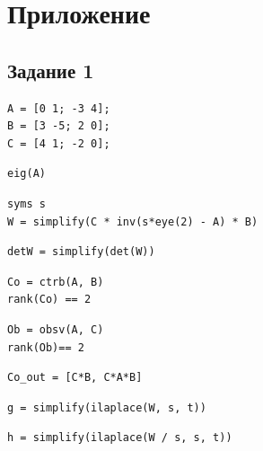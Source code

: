 \documentclass[a4paper,12pt]{article}
\begin{document}
	
	
	
	\newpage
\section{Приложение}

\subsection*{Задание 1}

\begin{lstlisting}[caption={Инициализация}]
A = [0 1; -3 4];
B = [3 -5; 2 0];
C = [4 1; -2 0];
\end{lstlisting}

\begin{lstlisting}[caption={Собственные числа матрицы \(A\)}, label={lst:A1}]
eig(A)
\end{lstlisting}

\begin{lstlisting}[caption={Передаточная матрица системы}, label={lst:W1}]
syms s
W = simplify(C * inv(s*eye(2) - A) * B)
\end{lstlisting}

\begin{lstlisting}[caption={Определитель передаточной матрицы}, label={lst:detW1}]
detW = simplify(det(W))
\end{lstlisting}

\begin{lstlisting}[caption={Исследование управляемости}, label={lst:Co1}]
Co = ctrb(A, B)
rank(Co) == 2
\end{lstlisting}

\begin{lstlisting}[caption={Исследование наблюдаемости}, label={lst:Ob1}]
Ob = obsv(A, C)
rank(Ob)== 2
\end{lstlisting}
	
	
\begin{lstlisting}[caption={Исследование управляемости по выходу}, label={lst:Co_out1}]
Co_out = [C*B, C*A*B]
\end{lstlisting}	
	
	
\begin{lstlisting}[caption={Весовая характеристика}, label={lst:g1}]
g = simplify(ilaplace(W, s, t))
\end{lstlisting}
	
\begin{lstlisting}[caption={Переходная характеристика}, label={lst:h1}]
h = simplify(ilaplace(W / s, s, t))
\end{lstlisting}	
\end{document}
